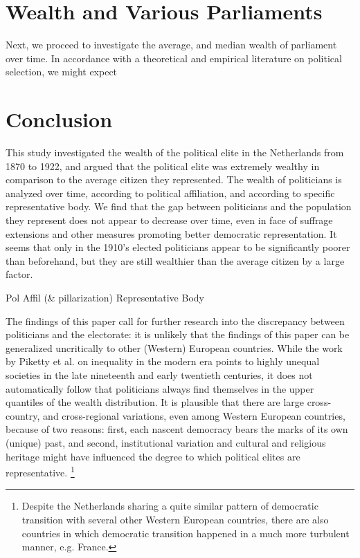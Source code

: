 \section{Wealth and Various Parliaments}
Next, we proceed to investigate the average, and median wealth of parliament over time. In accordance with a theoretical and empirical literature on political selection, we might expect 

\section{Conclusion}

This study investigated the wealth of the political elite in the Netherlands from 1870 to 1922, and argued that the political elite was extremely wealthy in comparison to the average citizen they represented. The wealth of politicians is analyzed over time, according to political affiliation, and according to specific representative body. We find that the gap between politicians and the population they represent does not appear to decrease over time, even in face of suffrage extensions and other measures promoting better democratic representation. It seems that only in the 1910's elected politicians appear to be significantly poorer than beforehand, but they are still wealthier than the average citizen by a large factor. 

Pol Affil (\& pillarization)
Representative Body

The findings of this paper call for further research into the discrepancy between politicians and the electorate: it is unlikely that the findings of this paper can be generalized uncritically to other (Western) European countries. While the work by Piketty et al. on inequality in the modern era points to highly unequal societies in the late nineteenth and early twentieth centuries, it does not automatically follow that politicians always find themselves in the upper quantiles of the wealth distribution. \autocite{piketty2003income, piketty2014inequality} It is plausible that there are large cross-country, and cross-regional variations, even among Western European countries, because of two reasons: first, each nascent democracy bears the marks of its own (unique) past, and second, institutional variation and cultural and religious heritage might have influenced the degree to which political elites are representative. \autocite{acemoglu2011consequences} \footnote{Despite the Netherlands sharing a quite similar pattern of democratic transition with several other Western European countries, there are also countries in which democratic transition happened in a much more turbulent manner, e.g. France. }

